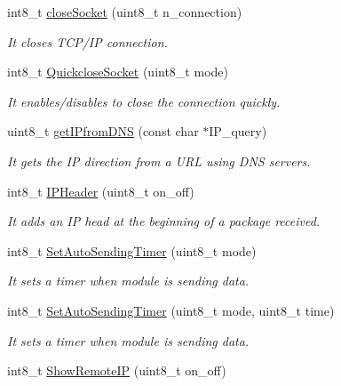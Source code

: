 \begin{DoxyCompactItemize}
int8\+\_\+t \hyperlink{class_wasp_g_p_r_s___pro__core_abd7a75e3ce9cc6a0654cf2db0db4bd3a}{close\+Socket} (uint8\+\_\+t n\+\_\+connection)
\begin{DoxyCompactList}\small\item\em It closes T\+C\+P/\+IP connection. \end{DoxyCompactList}\item 
int8\+\_\+t \hyperlink{class_wasp_g_p_r_s___pro__core_a7e687ee9101291bc5f70a49907a29876}{Quickclose\+Socket} (uint8\+\_\+t mode)
\begin{DoxyCompactList}\small\item\em It enables/disables to close the connection quickly. \end{DoxyCompactList}\item 
uint8\+\_\+t \hyperlink{class_wasp_g_p_r_s___pro__core_ab73363dfc1d1b34382267b2b0c686072}{get\+I\+Pfrom\+D\+NS} (const char $\ast$I\+P\+\_\+query)
\begin{DoxyCompactList}\small\item\em It gets the IP direction from a U\+RL using D\+NS servers. \end{DoxyCompactList}\item 
int8\+\_\+t \hyperlink{class_wasp_g_p_r_s___pro__core_af8c0d32f7fb6f748f4aa89386f8922c2}{I\+P\+Header} (uint8\+\_\+t on\+\_\+off)
\begin{DoxyCompactList}\small\item\em It adds an IP head at the beginning of a package received. \end{DoxyCompactList}\item 
int8\+\_\+t \hyperlink{class_wasp_g_p_r_s___pro__core_a16283d13cc922589dd783be4058e8bc2}{Set\+Auto\+Sending\+Timer} (uint8\+\_\+t mode)
\begin{DoxyCompactList}\small\item\em It sets a timer when module is sending data. \end{DoxyCompactList}\item 
int8\+\_\+t \hyperlink{class_wasp_g_p_r_s___pro__core_a9a77748c18b9168a9fc4dfc0ade563bb}{Set\+Auto\+Sending\+Timer} (uint8\+\_\+t mode, uint8\+\_\+t time)
\begin{DoxyCompactList}\small\item\em It sets a timer when module is sending data. \end{DoxyCompactList}\item 
int8\+\_\+t \hyperlink{class_wasp_g_p_r_s___pro__core_a4089decc35f21d548a9b37516fa1117d}{Show\+Remote\+IP} (uint8\+\_\+t on\+\_\+off)

\end{DoxyCompactItemize}
